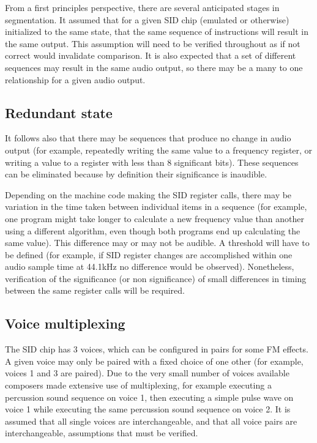 \documentclass[10pt]{article}
\begin{document}
\begin{multicols*}{2}
  From a first principles perspective, there are several anticipated
  stages in segmentation. It assumed that for a given SID chip
  (emulated or otherwise) initialized to the same state, that the same
  sequence of instructions will result in the same output. This
  assumption will need to be verified throughout as if not correct
  would invalidate comparison. It is also expected that a set of
  different sequences may result in the same audio output, so there
  may be a many to one relationship for a given audio output.

  \subsection{Redundant state}
  It follows also that there may be sequences that produce no change
  in audio output (for example, repeatedly writing the same value to a
  frequency register, or writing a value to a register with less than
  8 significant bits). These sequences can be eliminated because by
  definition their significance is inaudible.

  Depending on the machine code making the SID register calls, there
  may be variation in the time taken between individual items in a
  sequence (for example, one program might take longer to calculate a
  new frequency value than another using a different algorithm, even
  though both programs end up calculating the same value). This
  difference may or may not be audible. A threshold will have to be
  defined (for example, if SID register changes are accomplished
  within one audio sample time at 44.1kHz no difference would be
  observed).  Nonetheless, verification of the significance (or non
  significance) of small differences in timing between the same
  register calls will be required.

  \subsection{Voice multiplexing}
  The SID chip has 3 voices, which can be configured in pairs for some
  FM effects. A given voice may only be paired with a fixed choice of
  one other (for example, voices 1 and 3 are paired). Due to the very
  small number of voices available composers made extensive use of
  multiplexing, for example executing a percussion sound sequence on
  voice 1, then executing a simple pulse wave on voice 1 while
  executing the same percussion sound sequence on voice 2. It is
  assumed that all single voices are interchangeable, and that all
  voice pairs are interchangeable, assumptions that must be verified.


\end{multicols*}
\end{document}

